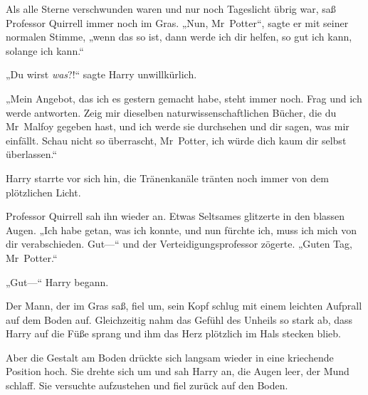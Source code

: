 Als alle Sterne verschwunden waren und nur noch Tageslicht übrig war, saß Professor Quirrell immer noch im Gras.
„Nun, Mr~Potter“, sagte er mit seiner normalen Stimme, „wenn das so ist, dann werde ich dir helfen, so gut ich kann, solange ich kann.“

„Du wirst \emph{was}?!“ sagte Harry unwillkürlich.

„Mein Angebot, das ich es gestern gemacht habe, steht immer noch. Frag und ich werde antworten. Zeig mir dieselben naturwissenschaftlichen Bücher, die du Mr~Malfoy gegeben hast, und ich werde sie durchsehen und dir sagen, was mir einfällt. Schau nicht so überrascht, Mr~Potter, ich würde dich kaum dir selbst überlassen.“

Harry starrte vor sich hin, die Tränenkanäle tränten noch immer von dem plötzlichen Licht.

Professor Quirrell sah ihn wieder an. Etwas Seltsames glitzerte in den blassen Augen. „Ich habe getan, was ich konnte, und nun fürchte ich, muss ich mich von dir verabschieden. Gut—“ und der Verteidigungsprofessor zögerte. „Guten Tag, Mr~Potter.“

„Gut—“ Harry begann.

Der Mann, der im Gras saß, fiel um, sein Kopf schlug mit einem leichten Aufprall auf dem Boden auf. Gleichzeitig nahm das Gefühl des Unheils so stark ab, dass Harry auf die Füße sprang und ihm das Herz plötzlich im Hals stecken blieb.

Aber die Gestalt am Boden drückte sich langsam wieder in eine kriechende Position hoch. Sie drehte sich um und sah Harry an, die Augen leer, der Mund schlaff. Sie versuchte aufzustehen und fiel zurück auf den Boden.

